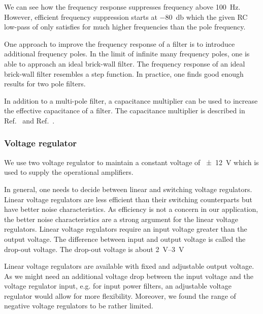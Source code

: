 We can see how the frequency response suppresses frequency above \SI{100}{\hertz}.
However, efficient frequency suppression starts at \SI{-80}{\decibel} which the given RC low-pass of  only satisfies for much higher frequencies than the pole frequency.

One approach to improve the frequency response of a filter is to introduce additional frequency poles.
In the limit of infinite many frequency poles, one is able to approach an ideal brick-wall filter.
The frequency response of an ideal brick-wall filter resembles a step function.
In practice, one finds good enough results for two pole filters.

In addition to a multi-pole filter, a capacitance multiplier can be used to increase the effective capacitance of a filter.
The capacitance multiplier is described in Ref.~\cite[p.~536]{Hobbs11} and Ref.~\cite[p.~578]{Horowitz15}.

\subsubsection{Voltage regulator}

We use two voltage regulator to maintain a constant voltage of \SI{\pm12}{\volt} which is used to supply the operational amplifiers.

In general, one needs to decide between linear and switching voltage regulators.
Linear voltage regulators are less efficient than their switching counterparts but have better noise characteristics.
As efficiency is not a concern in our application, the better noise characteristics are a strong argument for the linear voltage regulators.
Linear voltage regulators require an input voltage greater than the output voltage.
The difference between input and output voltage is called the drop-out voltage.
The drop-out voltage is about \SIrange{2}{3}{\volt}

Linear voltage regulators are available with fixed and adjustable output voltage.
As we might need an additional voltage drop between the input voltage and the voltage regulator input, e.g. for input power filters, an adjustable voltage regulator would allow for more flexibility.
Moreover, we found the range of negative voltage regulators to be rather limited.

